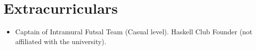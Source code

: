 \documentclass[letterpaper,11pt]{article}
\newcommand{\resumeSubHeadingListStart}{\begin{itemize}[leftmargin=*, label={}]}
\newcommand{\resumeSubHeadingListEnd}{\end{itemize}}
\begin{document}
\section{Extracurriculars}
 \resumeSubHeadingListStart
   \item{
       Captain of Intramural Futsal Team (Casual level). Haskell Club Founder
       (not affiliated with the university).
   }

 \resumeSubHeadingListEnd
\end{document}
